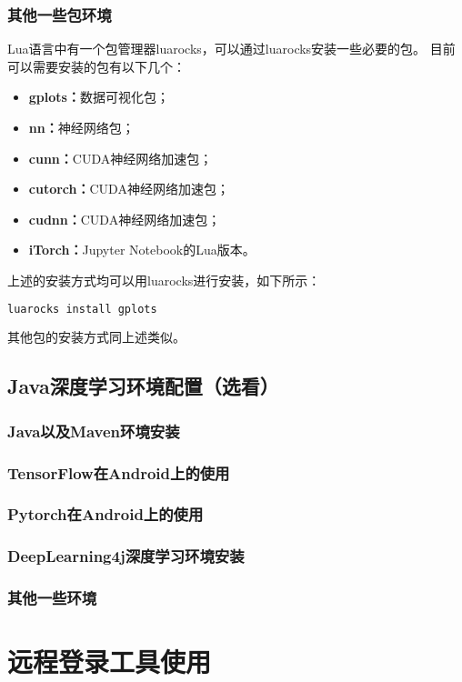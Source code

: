 \documentclass[lang=cn,a4paper,newtx]{elegantpaper}
\begin{document}
\subsubsection{其他一些包环境}
Lua语言中有一个包管理器luarocks，可以通过luarocks安装一些必要的包。
目前可以需要安装的包有以下几个：
\begin{itemize}
  \item \textbf{gplots：}数据可视化包；
  \item \textbf{nn：}神经网络包；
  \item \textbf{cunn：}CUDA神经网络加速包；
  \item \textbf{cutorch：}CUDA神经网络加速包；
  \item \textbf{cudnn：}CUDA神经网络加速包；
  \item \textbf{iTorch：}Jupyter Notebook的Lua版本。
\end{itemize}

上述的安装方式均可以用luarocks进行安装，如下所示：
\begin{lstlisting}[language=bash]
  luarocks install gplots 
\end{lstlisting}

其他包的安装方式同上述类似。

\subsection{Java深度学习环境配置（选看）}
\subsubsection{Java以及Maven环境安装}
\subsubsection{TensorFlow在Android上的使用}
\subsubsection{Pytorch在Android上的使用}
\subsubsection{DeepLearning4j深度学习环境安装}
\subsubsection{其他一些环境}
\section{远程登录工具使用}
\end{document}

